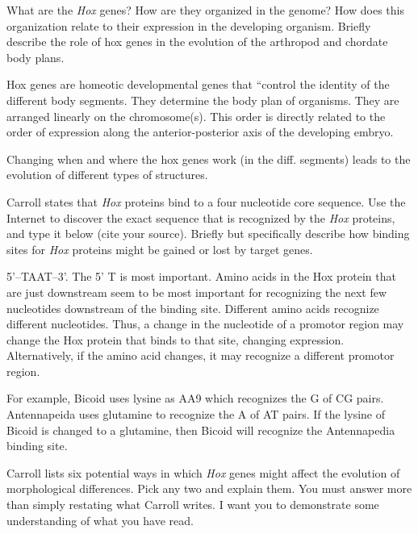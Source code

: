 \documentclass[11pt, addpoints]{exam}
\begin{document}
\begin{questions}

\question[5]
What are the \emph{Hox} genes? How are they organized in the genome?
  How does this organization relate to their expression in the
  developing organism. Briefly describe the role of hox genes in the
  evolution of the arthropod and chordate body plans.

\begin{solution}
Hox genes are homeotic developmental genes that “control the identity of the different body segments.  They determine the body plan of organisms.  They are arranged linearly on the chromosome(s).  This order is directly related to the order of expression along the anterior-posterior axis of the developing embryo. 

Changing when and where the hox genes work (in the diff. segments) leads to the evolution of different types of structures.
\end{solution}

\question[5]
Carroll states that \emph{Hox} proteins bind to a four nucleotide core
  sequence. Use the Internet to discover the exact sequence that is
  recognized by the \emph{Hox} proteins, and type it below (cite your
  source). Briefly but specifically describe how binding sites for
  \emph{Hox} proteins might be gained or lost by target genes.
  
\begin{solution}
5'–TAAT–3'.  The 5' T is most important.  Amino acids in the Hox protein that are just downstream seem to be most important for recognizing the next few nucleotides downstream of the binding site.  Different amino acids recognize different nucleotides.  Thus, a change in the nucleotide of a promotor region may change the Hox protein that binds to that site, changing expression.  Alternatively, if the amino acid changes, it may recognize a different promotor region.
	
For example, Bicoid uses lysine as AA9 which recognizes the G of CG pairs. Antennapeida uses glutamine to recognize the A of AT pairs.  If the lysine of Bicoid is changed to a glutamine, then Bicoid will recognize the Antennapedia binding site.
\end{solution}

\question[5]
Carroll lists six potential ways in which \emph{Hox} genes might
  affect the evolution of morphological differences. Pick any two and
  explain them. You must answer more than simply restating what Carroll
  writes. I want you to demonstrate some understanding of what you have
  read. 


\end{questions}
\end{document}
